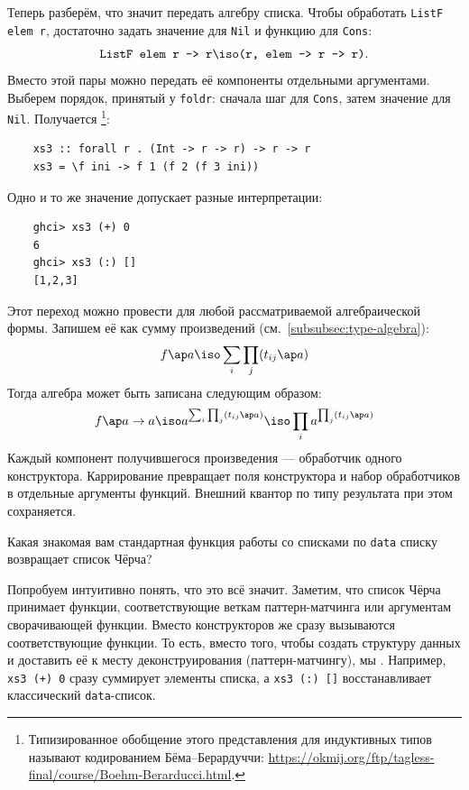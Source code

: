 Теперь разберём, что значит передать алгебру списка.
Чтобы обработать \texttt{ListF elem r}, достаточно задать значение для \texttt{Nil} и функцию для \texttt{Cons}:
\[
    \texttt{ListF elem r -> r}
    \iso \texttt{(r, elem -> r -> r)}.
\]
Вместо этой пары можно передать её компоненты отдельными аргументами.
Выберем порядок, принятый у \texttt{foldr}: сначала шаг для \texttt{Cons}, затем значение для \texttt{Nil}.
Получается \footnote{Типизированное обобщение этого представления для индуктивных типов называют кодированием Бёма--Берардуччи: \url{https://okmij.org/ftp/tagless-final/course/Boehm-Berarducci.html}.}:
\begin{verbatim}
    xs3 :: forall r . (Int -> r -> r) -> r -> r
    xs3 = \f ini -> f 1 (f 2 (f 3 ini))
\end{verbatim}
Одно и то же значение допускает разные интерпретации:
\begin{verbatim}
    ghci> xs3 (+) 0
    6
    ghci> xs3 (:) []
    [1,2,3]
\end{verbatim}

Этот переход можно провести для любой рассматриваемой алгебраической формы.
Запишем её как сумму произведений (см.~\ref{subsubsec:type-algebra}):
\[
    f\ap a \iso \sum_{i}\prod_{j} (t_{ij}\ap a)
\]
Тогда алгебра может быть записана следующим образом:
\[
    f\ap a\to a\iso a^{\sum_{i}\prod_{j} (t_{ij}\ap a)} \iso \prod_{i}a^{\prod_{j} (t_{ij}\ap a)}
\]
Каждый компонент получившегося произведения --- обработчик одного конструктора.
Каррирование превращает поля конструктора и набор обработчиков в отдельные аргументы функций.
Внешний квантор по типу результата при этом сохраняется.

\begin{task}
    Какая знакомая вам стандартная функция работы со списками по \texttt{data} списку возвращает список Чёрча?
\end{task}

Попробуем интуитивно понять, что это всё значит.
Заметим, что список Чёрча принимает функции, соответствующие веткам паттерн-матчинга или аргументам сворачивающей функции.
Вместо конструкторов же сразу вызываются соответствующие функции.
То есть, вместо того, чтобы создать структуру данных и доставить её к месту деконструирования (паттерн-матчингу), мы .
Например, \texttt{xs3 (+) 0} сразу суммирует элементы списка, а \texttt{xs3 (:) []} восстанавливает классический \texttt{data}-список.

